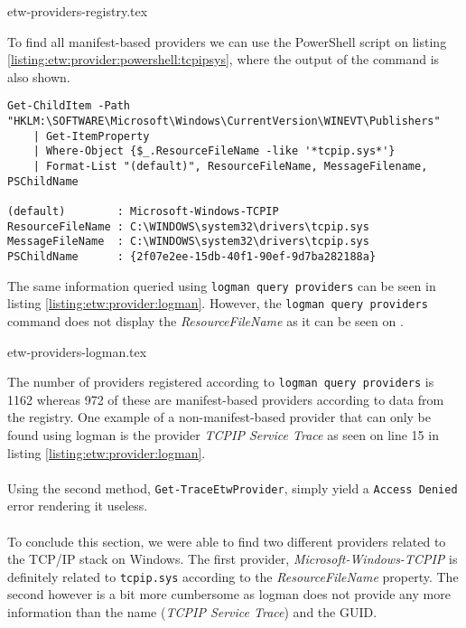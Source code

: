 \documentclass{report}
\begin{document}
{etw-providers-registry.tex}

To find all manifest-based providers we can use the PowerShell script on listing \ref{listing:etw:provider:powershell:tcpipsys}, where the output of the command is also shown.

\begin{listing}[H]
\begin{verbatim}
Get-ChildItem -Path "HKLM:\SOFTWARE\Microsoft\Windows\CurrentVersion\WINEVT\Publishers"
    | Get-ItemProperty
    | Where-Object {$_.ResourceFileName -like '*tcpip.sys*'}
    | Format-List "(default)", ResourceFileName, MessageFilename, PSChildName

(default)        : Microsoft-Windows-TCPIP
ResourceFileName : C:\WINDOWS\system32\drivers\tcpip.sys
MessageFileName  : C:\WINDOWS\system32\drivers\tcpip.sys
PSChildName      : {2f07e2ee-15db-40f1-90ef-9d7ba282188a}
\end{verbatim}
\caption{PowerShell command to query manifest-based providers and the result hereof}
\label{listing:etw:provider:powershell:tcpipsys}
\end{listing}

The same information queried using \texttt{logman query providers} can be seen in listing \ref{listing:etw:provider:logman}. However, the \texttt{logman query providers} command does not display the \emph{ResourceFileName} as it can be seen on .

{etw-providers-logman.tex}

The number of providers registered according to \texttt{logman query providers} is 1162 whereas 972 of these are manifest-based providers according to data from the registry. One example of a non-manifest-based provider that can only be found using logman is the provider \emph{TCPIP Service Trace} as seen on line 15 in listing \ref{listing:etw:provider:logman}.
\\
\\
Using the second method, \texttt{Get-TraceEtwProvider}, simply yield a \texttt{Access Denied} error rendering it useless.
\\
\\
To conclude this section, we were able to find two different providers related to the TCP/IP stack on Windows. The first provider, \emph{Microsoft-Windows-TCPIP} is definitely related to \texttt{tcpip.sys} according to the \emph{ResourceFileName} property. The second however is a bit more cumbersome as logman does not provide any more information than the name (\emph{TCPIP Service Trace}) and the GUID.
\end{document}
